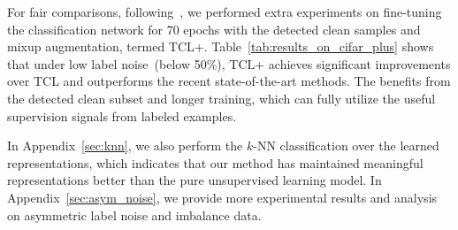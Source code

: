 For fair comparisons, following~\cite{ortego2021multi,li2022selective}, we performed extra experiments on fine-tuning the classification network for 70 epochs with the detected clean samples and mixup augmentation, termed TCL+. Table~\ref{tab:results_on_cifar_plus} shows that under low label noise~(below 50\%), TCL+ achieves significant improvements over TCL and outperforms the recent state-of-the-art methods. The benefits from the detected clean subset and longer training, which can fully utilize the useful supervision signals from labeled examples.


In Appendix~\ref{sec:knn}, we also perform the $k$-NN classification over the learned representations, which indicates that our method has maintained meaningful representations better than the pure unsupervised learning model.
In Appendix~\ref{sec:asym_noise}, we provide more experimental results and analysis on asymmetric label noise and imbalance data.


\begin{table}[t]
   \centering
   \caption{
      Comparisons with SOTAs under \emph{low} label noise.
   }
   \label{tab:results_on_cifar_plus}
\end{table}

